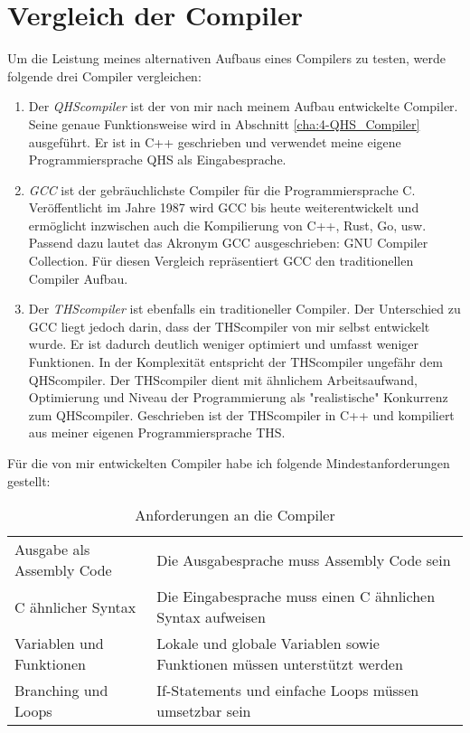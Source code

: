 \chapter{Vergleich der Compiler} \label{cha:2-Vergleich}
Um die Leistung meines alternativen Aufbaus eines Compilers zu testen, werde folgende drei Compiler vergleichen:

\begin{enumerate}
\item
Der \textit{QHScompiler} ist der von mir nach meinem Aufbau entwickelte Compiler. Seine genaue Funktionsweise wird in Abschnitt \ref{cha:4-QHS_Compiler} ausgeführt.
Er ist in C++ geschrieben und verwendet meine eigene Programmiersprache QHS als Eingabesprache. 

\item
\textit{GCC} ist der gebräuchlichste Compiler für die Programmiersprache C. Veröffentlicht im Jahre 1987 wird GCC bis heute weiterentwickelt und ermöglicht inzwischen auch die Kompilierung von C++, Rust, Go, usw.
Passend dazu lautet das Akronym GCC ausgeschrieben: GNU Compiler Collection.
Für diesen Vergleich repräsentiert GCC den traditionellen Compiler Aufbau.

\item
Der \textit{THScompiler} ist ebenfalls ein traditioneller Compiler. Der Unterschied zu GCC liegt jedoch darin, dass der THScompiler von mir selbst entwickelt wurde. 
Er ist dadurch deutlich weniger optimiert und umfasst weniger Funktionen. In der Komplexität entspricht der THScompiler ungefähr dem QHScompiler.
Der THScompiler dient mit ähnlichem Arbeitsaufwand, Optimierung und Niveau der Programmierung als "realistische" Konkurrenz zum QHScompiler.
Geschrieben ist der THScompiler in C++ und kompiliert aus meiner eigenen Programmiersprache THS.
\end{enumerate}

Für die von mir entwickelten Compiler habe ich folgende Mindestanforderungen gestellt:

\begin{table}[H]
    \centering
    \caption{Anforderungen an die Compiler}
    \label{tab:requirements}
    \vspace{3mm} %
    
    \begin{tabular}{l|l}
    Ausgabe als Assembly Code       & Die Ausgabesprache muss Assembly Code sein                               \\
    C ähnlicher Syntax              & Die Eingabesprache muss einen C ähnlichen Syntax aufweisen               \\
    Variablen und Funktionen        & Lokale und globale Variablen sowie Funktionen müssen unterstützt werden  \\
    Branching und Loops             & If-Statements und einfache Loops müssen umsetzbar sein
    \end{tabular}
\end{table}

